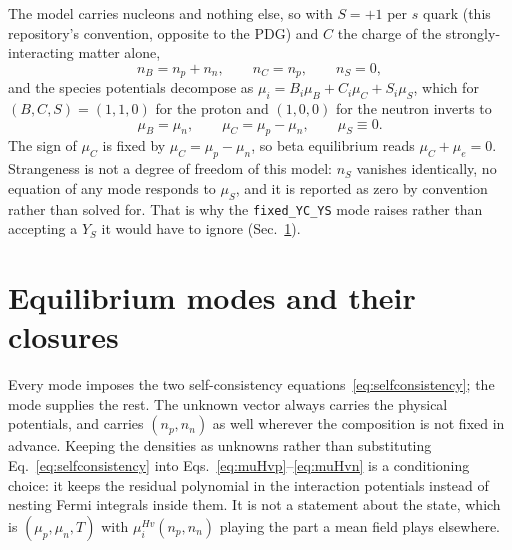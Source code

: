 \documentclass[aps,prc,onecolumn,superscriptaddress,nofootinbib,10pt]{revtex4-2}
\newcommand{\nB}{n_B}
\newcommand{\nC}{n_C}
\newcommand{\nS}{n_S}
\newcommand{\muB}{\mu_B}
\newcommand{\muC}{\mu_C}
\newcommand{\muS}{\mu_S}
\newcommand{\muHv}[1]{\mu^{Hv}_{#1}}
\begin{document}
The model carries nucleons and nothing else, so with $S = +1$ per $s$ quark
(this repository's convention, opposite to the PDG) and $C$ the charge of the
strongly-interacting matter alone,
%
\begin{equation}
\nB = n_p + n_n , \qquad \nC = n_p , \qquad \nS = 0 ,
\end{equation}
%
and the species potentials decompose as
$\mu_i = B_i \muB + C_i \muC + S_i \muS$, which for $(B, C, S) = (1,1,0)$ for
the proton and $(1,0,0)$ for the neutron inverts to
%
\begin{equation}
\muB = \mu_n , \qquad \muC = \mu_p - \mu_n , \qquad \muS \equiv 0 .
\label{eq:basis}
\end{equation}
%
The sign of $\muC$ is fixed by $\muC = \mu_p - \mu_n$, so beta equilibrium
reads $\muC + \mu_e = 0$. Strangeness is not a degree of freedom of this
model: $\nS$ vanishes identically, no equation of any mode responds to $\muS$,
and it is reported as zero by convention rather than solved for. That is why
the \texttt{fixed\_YC\_YS} mode raises rather than accepting a $Y_S$ it would
have to ignore (Sec.~\ref{sec:modes}).

\section{Equilibrium modes and their closures}
\label{sec:modes}

Every mode imposes the two self-consistency
equations~\eqref{eq:selfconsistency}; the mode supplies the rest. The unknown
vector always carries the physical potentials, and carries $(n_p, n_n)$ as
well wherever the composition is not fixed in advance. Keeping the densities
as unknowns rather than substituting Eq.~\eqref{eq:selfconsistency} into
Eqs.~\eqref{eq:muHvp}--\eqref{eq:muHvn} is a conditioning choice: it keeps the
residual polynomial in the interaction potentials instead of nesting Fermi
integrals inside them. It is not a statement about the state, which is
$(\mu_p, \mu_n, T)$ with $\muHv{i}(n_p, n_n)$ playing the part a mean field
plays elsewhere.
\end{document}
